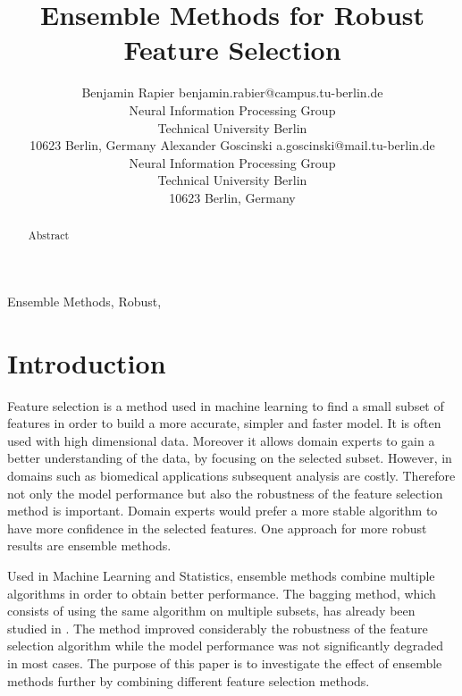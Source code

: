 \documentclass[twoside,11pt]{article}
\begin{document}
\title{Ensemble Methods for Robust Feature Selection}
\author{\name Benjamin Rapier \email benjamin.rabier@campus.tu-berlin.de \\
       \addr Neural Information Processing Group\\
       Technical University Berlin\\
       10623 Berlin, Germany
       \AND
       \name Alexander Goscinski \email a.goscinski@mail.tu-berlin.de \\
       \addr Neural Information Processing Group\\
       Technical University Berlin\\
       10623 Berlin, Germany}


\maketitle

\begin{abstract}%
  Abstract
\end{abstract}

\begin{keywords}
  Ensemble Methods, Robust, 
\end{keywords}

\section{Introduction}

Feature selection is a method used in machine learning to find a small subset of features in order to build a more accurate, simpler and faster model. It is often used with high dimensional data. Moreover it allows domain experts to gain a better understanding of the data, by focusing on the selected subset. However, in domains such as biomedical applications subsequent analysis are costly. Therefore not only the model performance but also the robustness of the feature selection method is important. Domain experts would prefer a more stable algorithm to have more confidence in the selected features. One approach for more robust results are ensemble methods.

Used in Machine Learning and Statistics, ensemble methods combine multiple algorithms in order to obtain better performance. The bagging method, which consists of using the same algorithm on multiple subsets, has already been studied in \cite{saeys2008}. The method improved considerably the robustness of the feature selection algorithm while the model performance was not significantly degraded in most cases. The purpose of this paper is to investigate the effect of ensemble methods further by combining different feature selection methods.
\end{document}

